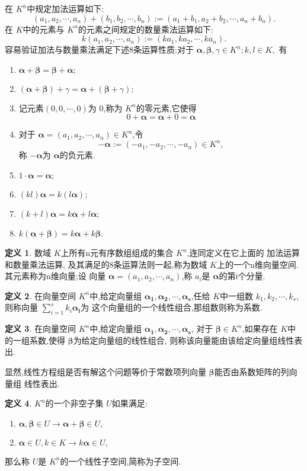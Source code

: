 \documentclass[a4paper,11pt]{article}%
\theoremstyle{remark}
\theoremstyle{definition}
\theoremstyle{definition}
\newtheorem*{definition}{定义}
\theoremstyle{plain}
\begin{document}
在 $K^n$中规定加法运算如下:
\[(a_1,a_2,\cdots,a_n)+(b_1,b_2,\cdots,b_n):=(a_1+b_1,a_2+b_2,\cdots,a_n+b_n).\]
在 $K$中的元素与 $K^n$的元素之间规定的数量乘法运算如下:
\[k(a_1,a_2,\cdots,a_n):=(ka_1,ka_2,\cdots,ka_n).\]
容易验证加法与数量乘法满足下述8条运算性质:对于 $\bm{\alpha},\bm{\beta},\gamma\in K^n;k,l\in K,$
有
\begin{enumerate}
\item $\bm{\alpha}+\bm{\beta}=\bm{\beta}+\bm{\alpha};$
\item $(\bm{\alpha}+\bm{\beta})+\gamma=\bm{\alpha}+(\bm{\beta}+\gamma);$
\item 记元素$(0,0,\cdots,0)$为 $0$,称为 $K^n$的零元素,它使得
\[0+\bm{\alpha}=\bm{\alpha}+0=\bm{\alpha}\]
\item 对于 $\bm{\alpha}=(a_1,a_2,\cdots,a_n)\in K^n$,令
\[-\bm{\alpha}:=(-a_1,-a_2,\cdots,-a_n)\in K^n,\]
称 $-\bm{\alpha}$为 $\bm{\alpha}$的负元素.
\item $1\cdot \bm{\alpha}=\bm{\alpha};$
\item $(kl)\bm{\alpha}=k(l \bm{\alpha});$
\item $(k+l)\bm{\alpha}=k \bm{\alpha}+l \bm{\alpha};$
\item $k(\bm{\alpha}+\bm{\beta})=k \bm{\alpha}+k \bm{\beta}.$
\end{enumerate}
\begin{definition}
    数域 $K$上所有n元有序数组组成的集合 $K^n$,连同定义在它上面的 加法运算和数量乘法运算,
    及其满足的8条运算法则一起,称为数域 $K$上的一个n维向量空间.其元素称为n维向量;设
    向量 $\bm{\alpha}=(a_1,a_2,\cdots,a_n)$,称 $a_i$是 $\bm{\alpha}$的第i个分量.
\end{definition}
\begin{definition}
    在向量空间 $K^n$中,给定向量组 $\bm{\alpha_1},\bm{\alpha_2},\cdots,\bm{\alpha_s}$,任给
    $K$中一组数 $k_1,k_2,\cdots,k_s$,则称向量 $\sum_{i=1}^{s}k_i \bm{\alpha_i}$为
    这个向量组的一个线性组合,那组数则称为系数.
\end{definition}
\begin{definition}
    在向量空间 $K^n$中,给定向量组 $\bm{\alpha_1},\bm{\alpha_2},\cdots,\bm{\alpha_s}$,
    对于 $\bm{\beta}\in K^n$,如果存在 $K$中的一组系数,使得 $\bm{\beta}$为给定向量组的线性组合,
    则称该向量能由该给定向量组线性表出.
\end{definition}
显然,线性方程组是否有解这个问题等价于常数项列向量 $\bm{\beta}$能否由系数矩阵的列向量组
线性表出.
\begin{definition}
    $K^n$的一个非空子集 $U$如果满足:
    \begin{enumerate}
        \item $\bm{\alpha},\bm{\beta}\in U\rightarrow \bm{\alpha}+\bm{\beta}\in U,$
        \item $\bm{\alpha}\in U,k\in K \rightarrow k \bm{\alpha}\in U,$
    \end{enumerate}
    那么称 $U$是 $K^n$的一个线性子空间,简称为子空间.
\end{definition}
\end{document}
